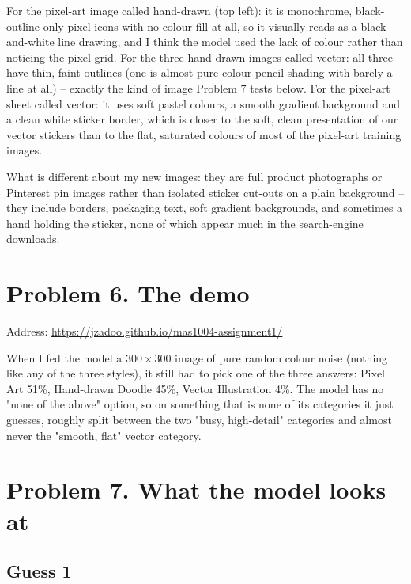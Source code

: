 \documentclass[11pt]{article}
\begin{document}
For the pixel-art image called hand-drawn (top left): it is monochrome,
black-outline-only pixel icons with no colour fill at all, so it visually
reads as a black-and-white line drawing, and I think the model used the lack
of colour rather than noticing the pixel grid. For the three hand-drawn
images called vector: all three have thin, faint outlines (one is almost
pure colour-pencil shading with barely a line at all) -- exactly the kind of
image Problem 7 tests below. For the pixel-art sheet called vector: it uses
soft pastel colours, a smooth gradient background and a clean white sticker
border, which is closer to the soft, clean presentation of our vector
stickers than to the flat, saturated colours of most of the pixel-art
training images.

What is different about my new images: they are full product photographs or
Pinterest pin images rather than isolated sticker cut-outs on a plain
background -- they include borders, packaging text, soft gradient
backgrounds, and sometimes a hand holding the sticker, none of which appear
much in the search-engine downloads.

\section*{Problem 6. The demo}

Address: \url{https://jzadoo.github.io/mas1004-assignment1/}

When I fed the model a 300\,$\times$\,300 image of pure random colour noise
(nothing like any of the three styles), it still had to pick one of the three
answers: Pixel Art 51\%, Hand-drawn Doodle 45\%, Vector Illustration 4\%. The
model has no "none of the above" option, so on something that is none of its
categories it just guesses, roughly split between the two "busy, high-detail"
categories and almost never the "smooth, flat" vector category.

\section*{Problem 7. What the model looks at}

\subsection*{Guess 1}
\end{document}
